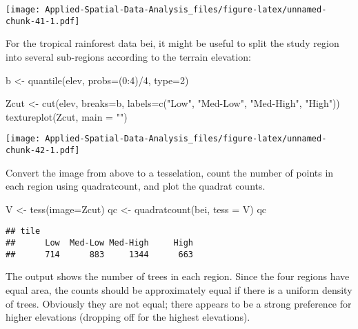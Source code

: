 \documentclass[
]{book}
\newenvironment{Shaded}{\begin{snugshade}}{\end{snugshade}}
\newcommand{\AttributeTok}[1]{\textcolor[rgb]{0.77,0.63,0.00}{#1}}
\newcommand{\DecValTok}[1]{\textcolor[rgb]{0.00,0.00,0.81}{#1}}
\newcommand{\FunctionTok}[1]{\textcolor[rgb]{0.00,0.00,0.00}{#1}}
\newcommand{\NormalTok}[1]{#1}
\newcommand{\OtherTok}[1]{\textcolor[rgb]{0.56,0.35,0.01}{#1}}
\newcommand{\SpecialCharTok}[1]{\textcolor[rgb]{0.00,0.00,0.00}{#1}}
\newcommand{\StringTok}[1]{\textcolor[rgb]{0.31,0.60,0.02}{#1}}
\begin{document}
\texttt{[image: Applied-Spatial-Data-Analysis\_files/figure-latex/unnamed-chunk-41-1.pdf]}

For the tropical rainforest data bei, it might be useful to split the study region into several
sub-regions according to the terrain elevation:

\begin{Shaded}
\begin{Highlighting}[]
\NormalTok{b }\OtherTok{\textless{}{-}} \FunctionTok{quantile}\NormalTok{(elev, }\AttributeTok{probs=}\NormalTok{(}\DecValTok{0}\SpecialCharTok{:}\DecValTok{4}\NormalTok{)}\SpecialCharTok{/}\DecValTok{4}\NormalTok{, }\AttributeTok{type=}\DecValTok{2}\NormalTok{)}

\NormalTok{Zcut }\OtherTok{\textless{}{-}} \FunctionTok{cut}\NormalTok{(elev, }\AttributeTok{breaks=}\NormalTok{b, }\AttributeTok{labels=}\FunctionTok{c}\NormalTok{(}\StringTok{"Low"}\NormalTok{, }\StringTok{"Med{-}Low"}\NormalTok{, }\StringTok{"Med{-}High"}\NormalTok{, }\StringTok{"High"}\NormalTok{))}
\FunctionTok{textureplot}\NormalTok{(Zcut, }\AttributeTok{main =} \StringTok{""}\NormalTok{)}
\end{Highlighting}
\end{Shaded}

\texttt{[image: Applied-Spatial-Data-Analysis\_files/figure-latex/unnamed-chunk-42-1.pdf]}

Convert the image from above to a tesselation, count the number of points in each region using quadratcount, and plot the quadrat counts.

\begin{Shaded}
\begin{Highlighting}[]
\NormalTok{V }\OtherTok{\textless{}{-}} \FunctionTok{tess}\NormalTok{(}\AttributeTok{image=}\NormalTok{Zcut)}
\NormalTok{qc }\OtherTok{\textless{}{-}} \FunctionTok{quadratcount}\NormalTok{(bei, }\AttributeTok{tess =}\NormalTok{ V)}
\NormalTok{qc}
\end{Highlighting}
\end{Shaded}

\begin{verbatim}
## tile
##      Low  Med-Low Med-High     High 
##      714      883     1344      663
\end{verbatim}

The output shows the number of trees in each region. Since the four regions have equal area, the counts should be approximately equal if there is a uniform density of trees. Obviously they are not equal; there appears to be a strong preference for higher elevations (dropping off for the highest elevations).
\end{document}
